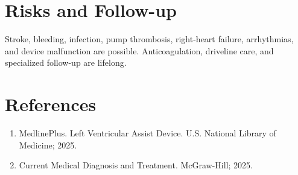 \section*{Risks and Follow-up}
Stroke, bleeding, infection, pump thrombosis, right-heart failure, arrhythmias, and device malfunction are possible. Anticoagulation, driveline care, and specialized follow-up are lifelong.
\section*{References}
\begin{enumerate}\item MedlinePlus. Left Ventricular Assist Device. U.S. National Library of Medicine; 2025.\item Current Medical Diagnosis and Treatment. McGraw-Hill; 2025.\end{enumerate}
\clearpage
